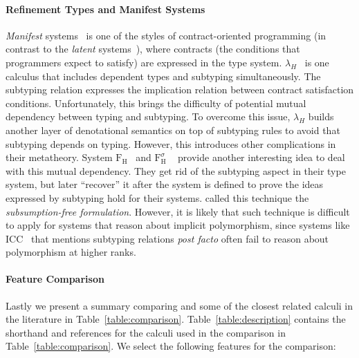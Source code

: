\paragraph{Refinement Types and Manifest Systems}

\emph{Manifest} systems~\citep{manifestcontracts} is one of the styles of
contract-oriented programming (in contrast to the \emph{latent} systems~\citep{latentcontracts}),
where contracts (the conditions that programmers expect to satisfy) are expressed
in the type system. $\lambda_H$~\citep{hybridtypes,manifestcontracts} is one calculus that
includes dependent types and subtyping simultaneously. The subtyping relation
expresses the implication relation between contract satisfaction conditions. Unfortunately,
this brings the difficulty of potential mutual dependency between typing and subtyping.
To overcome this issue, $\lambda_H$ builds another layer of denotational semantics on top of
subtyping rules to avoid that subtyping depends on typing. However, this introduces
other complications in their metatheory.
System $\mathrm{F}_\mathrm{H}$~\citep{fh} and $\mathrm{F}_\mathrm{H}^\sigma$
~\citep{fhsigma} provide another
interesting idea to deal with this mutual dependency. They get rid of the
subtyping aspect in their type system, but later ``recover'' it after
the system is defined to prove the ideas expressed by subtyping hold for their systems.
\citet{fhsigma} called this technique the \emph{subsumption-free formulation}.
However, it is likely that such technique is difficult to apply for systems that
reason about implicit polymorphism, since
systems like ICC~\citep{miquel2001implicit} that mentions subtyping relations
\emph{post facto} often fail to reason about polymorphism at higher ranks.

\paragraph{Feature Comparison}
Lastly we present a summary comparing \name and some of the closest related calculi
in the literature in Table~\ref{table:comparison}. Table~\ref{table:description} contains the
shorthand and references for the calculi used in the comparison in Table~\ref{table:comparison}.
We select the following features for the comparison:

